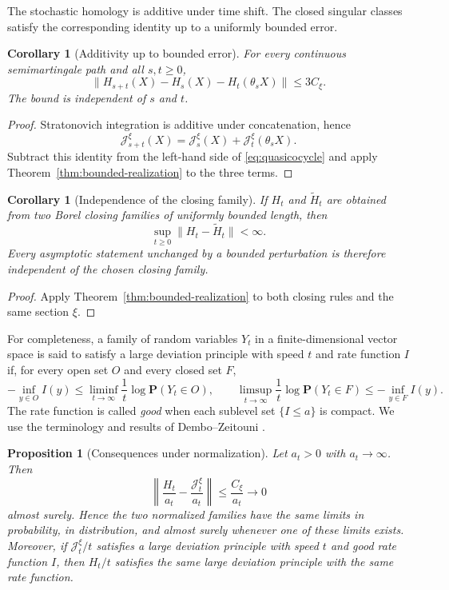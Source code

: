 \documentclass[a4paper,reqno]{amsart}
\newtheorem{proposition}[theorem]{Proposition}
\newtheorem{corollary}[theorem]{Corollary}
\theoremstyle{definition}
\begin{document}
The stochastic homology is additive under time shift.  The closed singular classes satisfy the corresponding identity up to a uniformly bounded error.

\begin{corollary}[Additivity up to bounded error]\label{cor:quasicocycle}
For every continuous semimartingale path and all $s,t\ge0$,
\begin{equation}\label{eq:quasicocycle}
 \bigl\|H_{s+t}(X)-H_s(X)-H_t(\theta_sX)\bigr\|\le 3C_\xi .
\end{equation}
The bound is independent of $s$ and $t$.
\end{corollary}

\begin{proof}
Stratonovich integration is additive under concatenation, hence
\[
   \mathcal J_{s+t}^\xi(X)
   =\mathcal J_s^\xi(X)+\mathcal J_t^\xi(\theta_sX).
\]
Subtract this identity from the left-hand side of \eqref{eq:quasicocycle} and
apply Theorem~\ref{thm:bounded-realization} to the three terms.
\end{proof}

\begin{corollary}[Independence of the closing family]\label{cor:closing-universality}
If $H_t$ and $\widetilde H_t$ are obtained from two Borel closing families of
uniformly bounded length, then
\[
   \sup_{t\ge0}\|H_t-\widetilde H_t\|<\infty .
\]
Every asymptotic statement unchanged by a bounded perturbation is therefore independent of the chosen closing family.
\end{corollary}

\begin{proof}
Apply Theorem~\ref{thm:bounded-realization} to both closing rules and the same
section $\xi$.
\end{proof}

For completeness, a family of random variables $Y_t$ in a finite-dimensional vector space is said to satisfy a large deviation principle with speed $t$ and rate function $I$ if, for every open set $O$ and every closed set $F$,
\[
 -\inf_{y\in O} I(y)
 \le \liminf_{t\to\infty}\frac1t\log\mathbf P(Y_t\in O),
 \qquad
 \limsup_{t\to\infty}\frac1t\log\mathbf P(Y_t\in F)
 \le -\inf_{y\in F} I(y).
\]
The rate function is called \emph{good} when each sublevel set $\{I\le a\}$ is compact.  We use the terminology and results of Dembo--Zeitouni \cite{DemboZeitouni}.

\begin{proposition}[Consequences under normalization]\label{prop:transfer}
Let $a_t>0$ with $a_t\to\infty$.  Then
\begin{equation}\label{eq:transfer}
   \left\|\frac{H_t}{a_t}-\frac{\mathcal J_t^\xi}{a_t}\right\|
   \le \frac{C_\xi}{a_t}\longrightarrow0
\end{equation}
almost surely.  Hence the two normalized families have the same limits in
probability, in distribution, and almost surely whenever one of these limits
exists.  Moreover, if $\mathcal J_t^\xi/t$ satisfies a large deviation
principle with speed $t$ and good rate function $I$, then $H_t/t$ satisfies
the same large deviation principle with the same rate function.
\end{proposition}
\end{document}
